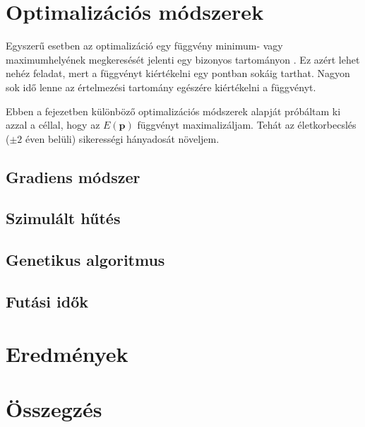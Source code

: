 \documentclass[12pt]{article}
\begin{document}
\section{Optimalizációs módszerek}
Egyszerű esetben az optimalizáció egy függvény minimum- vagy maximumhelyének megkeresését jelenti egy bizonyos tartományon \cite{Holder}. \iffalse TODO: példa a prog opt.-ról? \fi Ez azért lehet nehéz feladat, mert a függvényt kiértékelni egy pontban sokáig tarthat. Nagyon sok idő lenne az értelmezési tartomány egészére kiértékelni a függvényt.

Ebben a fejezetben különböző optimalizációs módszerek alapját próbáltam ki azzal a céllal, hogy az $E(\mathbf{p})$ függvényt maximalizáljam. Tehát az életkorbecslés ($\pm 2$ éven belüli) sikerességi hányadosát növeljem.
\subsection{Gradiens módszer}
\subsection{Szimulált hűtés}
\subsection{Genetikus algoritmus}
\subsection{Futási idők}
\section{Eredmények}
\section{Összegzés}


\end{document}
